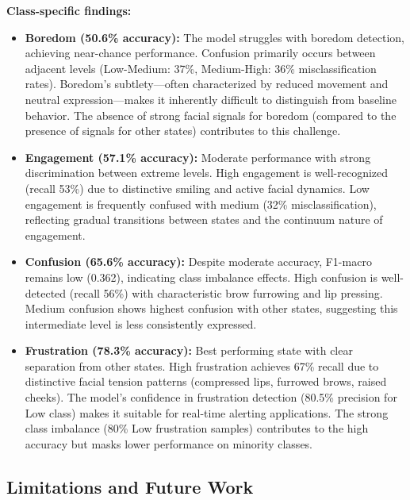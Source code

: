 \textbf{Class-specific findings:}
\begin{itemize}
    \item \textbf{Boredom (50.6\% accuracy):} The model struggles with boredom detection, achieving near-chance performance. Confusion primarily occurs between adjacent levels (Low-Medium: 37\%, Medium-High: 36\% misclassification rates). Boredom's subtlety---often characterized by reduced movement and neutral expression---makes it inherently difficult to distinguish from baseline behavior. The absence of strong facial signals for boredom (compared to the presence of signals for other states) contributes to this challenge.

    \item \textbf{Engagement (57.1\% accuracy):} Moderate performance with strong discrimination between extreme levels. High engagement is well-recognized (recall 53\%) due to distinctive smiling and active facial dynamics. Low engagement is frequently confused with medium (32\% misclassification), reflecting gradual transitions between states and the continuum nature of engagement.

    \item \textbf{Confusion (65.6\% accuracy):} Despite moderate accuracy, F1-macro remains low (0.362), indicating class imbalance effects. High confusion is well-detected (recall 56\%) with characteristic brow furrowing and lip pressing. Medium confusion shows highest confusion with other states, suggesting this intermediate level is less consistently expressed.

    \item \textbf{Frustration (78.3\% accuracy):} Best performing state with clear separation from other states. High frustration achieves 67\% recall due to distinctive facial tension patterns (compressed lips, furrowed brows, raised cheeks). The model's confidence in frustration detection (80.5\% precision for Low class) makes it suitable for real-time alerting applications. The strong class imbalance (80\% Low frustration samples) contributes to the high accuracy but masks lower performance on minority classes.
\end{itemize}

\subsection{Limitations and Future Work}
\label{sec:limitations}

